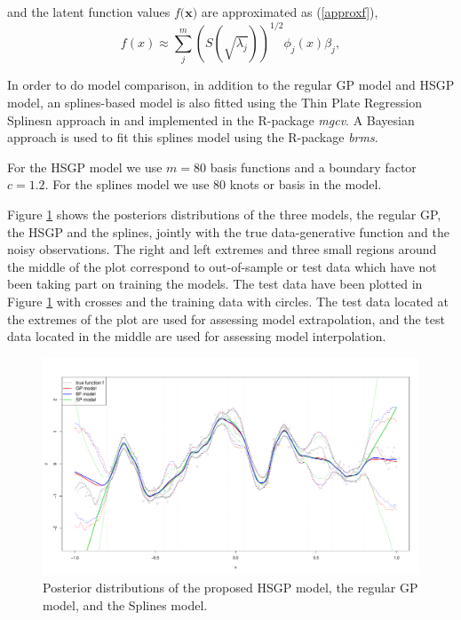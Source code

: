 \documentclass[]{interact}
\theoremstyle{plain}%
\theoremstyle{definition}
\theoremstyle{remark}
\begin{document}
\noindent and the latent function values $f(\mathbf{x)}$ are approximated as (\ref{approxf}),
%
\begin{equation*}
f(x) \approx \sum_{j}^m \left( S(\sqrt{\lambda_j})\right)^{1/2} \phi_j(x) \beta_j, \nonumber
\end{equation*}

In order to do model comparison, in addition to the regular GP model and HSGP model, an splines-based model is also fitted using the Thin Plate Regression Splinesn approach in \cite{wood2003thin} and implemented in the R-package \textit{mgcv}. A Bayesian approach is used to fit this splines model using the R-package \textit{brms}.

For the HSGP model we use $m=80$ basis functions and a boundary factor $c=1.2$. For the splines model we use 80 knots or basis in the model.

Figure \ref{fig10_Posteriors_exI} shows the posteriors distributions of the three models, the regular GP, the HSGP and the splines, jointly with the true data-generative function and the noisy observations. The right and left extremes and three small regions around the middle of the plot correspond to out-of-sample or test data which have not been taking part on training the models. The test data have been plotted in Figure \ref{fig10_Posteriors_exI} with crosses and the training data with circles. The test data located at the extremes of the plot are used for assessing model extrapolation, and the test data located in the middle are used for assessing model interpolation.

\begin{figure}[H]
\centering
\includegraphics[scale=0.35]{fig10_Posteriors_exI.pdf}
\caption{Posterior distributions of the proposed HSGP model, the regular GP model, and the Splines model.}
  \label{fig10_Posteriors_exI}
\end{figure}
\end{document}

